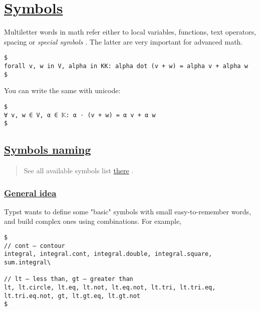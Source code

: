 \section{\texorpdfstring{\hyperref[symbols]{Symbols}}{Symbols}}\label{symbols}

Multiletter words in math refer either to local variables, functions,
text operators, spacing or \emph{special symbols} . The latter are very
important for advanced math.

\begin{verbatim}
$
forall v, w in V, alpha in KK: alpha dot (v + w) = alpha v + alpha w
$
\end{verbatim}

\pandocbounded{}

You can write the same with unicode:

\begin{verbatim}
$
∀ v, w ∈ V, α ∈ 𝕂: α ⋅ (v + w) = α v + α w
$
\end{verbatim}

\pandocbounded{}

\subsection{\texorpdfstring{\hyperref[symbols-naming]{Symbols
naming}}{Symbols naming}}\label{symbols-naming}

\begin{quote}
See all available symbols list
\href{https://typst.app/docs/reference/symbols/sym/}{there} .
\end{quote}

\subsubsection{\texorpdfstring{\hyperref[general-idea]{General
idea}}{General idea}}\label{general-idea}

Typst wants to define some "basic" symbols with small easy-to-remember
words, and build complex ones using combinations. For example,

\begin{verbatim}
$
// cont — contour
integral, integral.cont, integral.double, integral.square, sum.integral\

// lt — less than, gt — greater than
lt, lt.circle, lt.eq, lt.not, lt.eq.not, lt.tri, lt.tri.eq, lt.tri.eq.not, gt, lt.gt.eq, lt.gt.not
$
\end{verbatim}

